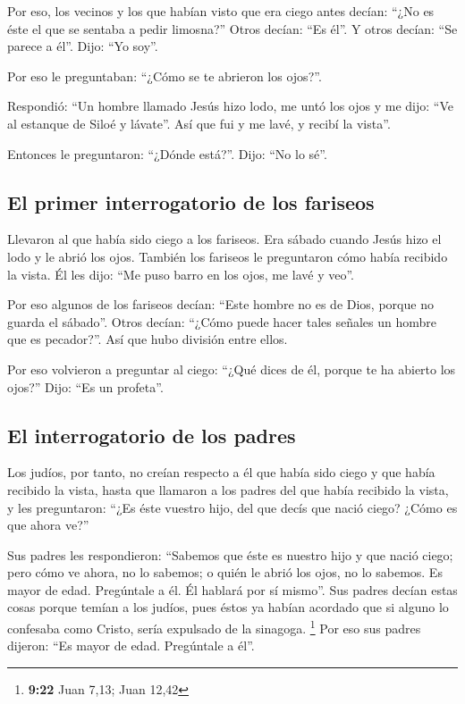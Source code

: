  Por eso, los vecinos y los que habían visto que era ciego
antes decían: ``¿No es éste el que se sentaba a pedir limosna?''
 Otros decían: ``Es él''. Y otros decían: ``Se parece a
él''. Dijo: ``Yo soy''.

 Por eso le preguntaban: ``¿Cómo se te abrieron los
ojos?''.

 Respondió: ``Un hombre llamado Jesús hizo lodo, me untó
los ojos y me dijo: ``Ve al estanque de Siloé y lávate''. Así que fui y
me lavé, y recibí la vista''.

 Entonces le preguntaron: ``¿Dónde está?''. Dijo: ``No lo
sé''.

\hypertarget{el-primer-interrogatorio-de-los-fariseos}{%
\subsection{El primer interrogatorio de los
fariseos}\label{el-primer-interrogatorio-de-los-fariseos}}

 Llevaron al que había sido ciego a los fariseos.
 Era sábado cuando Jesús hizo el lodo y le abrió los
ojos.  También los fariseos le preguntaron cómo había
recibido la vista. Él les dijo: ``Me puso barro en los ojos, me lavé y
veo''.

 Por eso algunos de los fariseos decían: ``Este hombre no
es de Dios, porque no guarda el sábado''. Otros decían: ``¿Cómo puede
hacer tales señales un hombre que es pecador?''. Así que hubo división
entre ellos.

 Por eso volvieron a preguntar al ciego: ``¿Qué dices de
él, porque te ha abierto los ojos?'' Dijo: ``Es un profeta''.

\hypertarget{el-interrogatorio-de-los-padres}{%
\subsection{El interrogatorio de los
padres}\label{el-interrogatorio-de-los-padres}}

 Los judíos, por tanto, no creían respecto a él que había
sido ciego y que había recibido la vista, hasta que llamaron a los
padres del que había recibido la vista,  y les
preguntaron: ``¿Es éste vuestro hijo, del que decís que nació ciego?
¿Cómo es que ahora ve?''

 Sus padres les respondieron: ``Sabemos que éste es
nuestro hijo y que nació ciego;  pero cómo ve ahora, no
lo sabemos; o quién le abrió los ojos, no lo sabemos. Es mayor de edad.
Pregúntale a él. Él hablará por sí mismo''.  Sus padres
decían estas cosas porque temían a los judíos, pues éstos ya habían
acordado que si alguno lo confesaba como Cristo, sería expulsado de la
sinagoga. \footnote{\textbf{9:22} Juan 7,13; Juan 12,42} 
Por eso sus padres dijeron: ``Es mayor de edad. Pregúntale a él''.

